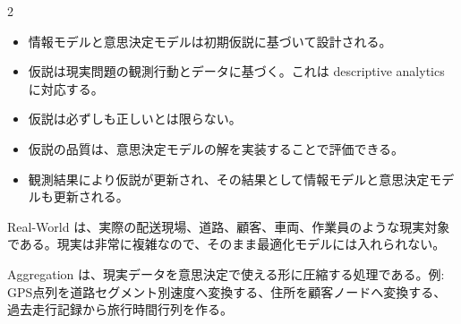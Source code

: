 \clearpage
{}
\begin{multicols}{2}\footnotesize\raggedcolumns
{}
\begin{itemize}
\item 情報モデルと意思決定モデルは初期仮説に基づいて設計される。
\item 仮説は現実問題の観測行動とデータに基づく。これは descriptive analytics に対応する。
\item 仮説は必ずしも正しいとは限らない。
\item 仮説の品質は、意思決定モデルの解を実装することで評価できる。
\item 観測結果により仮説が更新され、その結果として情報モデルと意思決定モデルも更新される。
\end{itemize}
Real-World は、実際の配送現場、道路、顧客、車両、作業員のような現実対象である。現実は非常に複雑なので、そのまま最適化モデルには入れられない。\par

Aggregation は、現実データを意思決定で使える形に圧縮する処理である。例: GPS点列を道路セグメント別速度へ変換する、住所を顧客ノードへ変換する、過去走行記録から旅行時間行列を作る。\par


\end{multicols}
